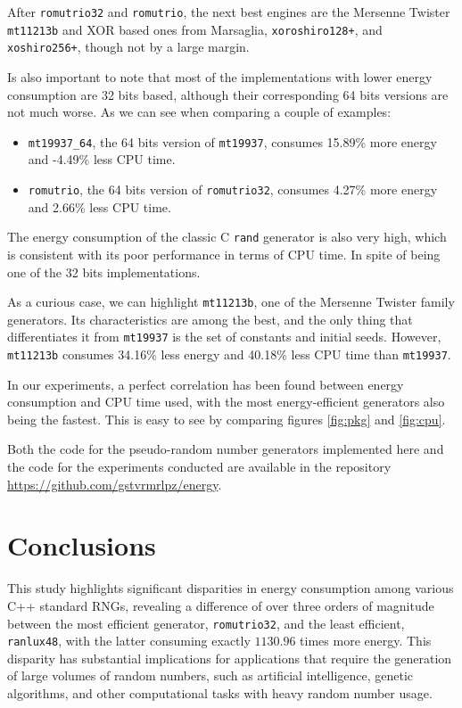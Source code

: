 \documentclass[dvipsnames,format=sigconf,anonymous=true,review=true]{acmart}
\begin{document}
After \texttt{romutrio32} and \texttt{romutrio}, the next best engines are the Mersenne Twister \texttt{mt11213b} and XOR based ones from Marsaglia, \texttt{xoroshiro128+}, and \texttt{xoshiro256+}, though not by a large margin.

Is also important to note that most of the implementations with lower energy consumption are 32 bits based, although their corresponding 64 bits versions are not much worse. As we can see when comparing a couple of examples:
\begin{itemize}
\item \texttt{mt19937\_64}, the 64 bits version of \texttt{mt19937}, consumes 15.89\% more energy and -4.49\% less CPU time.
\item \texttt{romutrio}, the 64 bits version of \texttt{romutrio32}, consumes 4.27\% more energy and 2.66\% less CPU time.
\end{itemize}

The energy consumption of the classic C \texttt{rand} generator is also very high, which is consistent with its poor performance in terms of CPU time. In spite of being one of the 32 bits implementations.

As a curious case, we can highlight \texttt{mt11213b}, one of the Mersenne Twister family generators. Its characteristics are among the best, and the only thing that differentiates it from \texttt{mt19937} is the set of constants and initial seeds. However, \texttt{mt11213b} consumes 34.16\% less energy and 40.18\% less CPU time than \texttt{mt19937}.

In our experiments, a perfect correlation has been found between energy consumption and CPU time used, with the most energy-efficient generators also being the fastest. This is easy to see by comparing figures \ref{fig:pkg} and \ref{fig:cpu}.

Both the code for the pseudo-random number generators implemented here and the code for the experiments conducted are available in the repository \url{https://github.com/gstvrmrlpz/energy}.

\section{Conclusions}
\label{sec:conclusions}

This study highlights significant disparities in energy consumption among various C++ standard RNGs, revealing a difference of over three orders of magnitude between the most efficient generator, \texttt{romutrio32}, and the least efficient, \texttt{ranlux48}, with the latter consuming exactly $1130.96$ times more energy. This disparity has substantial implications for applications that require the generation of large volumes of random numbers, such as artificial intelligence, genetic algorithms, and other computational tasks with heavy random number usage.
\end{document}
